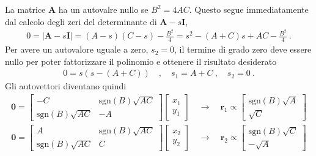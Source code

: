 \documentclass[letterpaper,10pt,italian]{jupyterBook}
\begin{document}
\sphinxAtStartPar
La matrice \(\mathbf{A}\) ha un autovalre nullo se \(B^2 = 4 AC\). Questo segue immediatamente dal calcolo degli zeri del determinante di \(\mathbf{A} - s \mathbf{I}\),
\begin{equation*}
\begin{split}0 = |\mathbf{A} - s \mathbf{I}| = ( A - s ) ( C - s ) - \frac{B^2}{4} = s^2 - ( A + C ) s + A C - \frac{B^2}{4} \ .\end{split}
\end{equation*}
\sphinxAtStartPar
Per avere un autovalore uguale a zero, \(s_2 = 0\), il termine di grado zero deve essere nullo per poter fattorizzare il polinomio e ottenere il risultato desiderato
\begin{equation*}
\begin{split}0 = s ( s - ( A + C ) ) \quad , \quad s_1 = A + C \ , \quad s_2 = 0 \ .\end{split}
\end{equation*}
\sphinxAtStartPar
Gli autovettori diventano quindi
\begin{equation*}
\begin{split}\mathbf{0} = \begin{bmatrix} - C & \text{sgn}(B) \sqrt{AC} \\ \text{sgn}(B)\sqrt{AC} & - A \end{bmatrix} \begin{bmatrix} x_1 \\ y_1 \end{bmatrix} \quad \rightarrow \quad \mathbf{r}_1 \propto \begin{bmatrix} \text{sgn}(B)\sqrt{A} \\ \sqrt{C} \end{bmatrix}\end{split}
\end{equation*}\begin{equation*}
\begin{split}\mathbf{0} = \begin{bmatrix} A & \text{sgn}(B)\sqrt{AC} \\ \text{sgn}(B)\sqrt{AC} & C \end{bmatrix} \begin{bmatrix} x_2 \\ y_2 \end{bmatrix} \quad \rightarrow \quad \mathbf{r}_2 \propto \begin{bmatrix} \text{sgn}(B)\sqrt{C} \\ -\sqrt{A} \end{bmatrix}\end{split}
\end{equation*}
\end{document}
